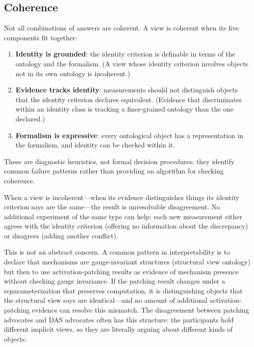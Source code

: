 \documentclass{article}
\begin{document}
\subsection{Coherence}\label{sec:coherence}

Not all combinations of answers are coherent.  A view is coherent when
its five components fit together:

\begin{enumerate}[leftmargin=*, label=(\roman*)]
\item \textbf{Identity is grounded}: the identity criterion is
      definable in terms of the ontology and the formalism.  (A view
      whose identity criterion involves objects not in its own ontology
      is incoherent.)
\item \textbf{Evidence tracks identity}: measurements should not
      distinguish objects that the identity criterion declares
      equivalent.  (Evidence that discriminates within an identity
      class is tracking a finer-grained ontology than the one
      declared.)
\item \textbf{Formalism is expressive}: every ontological object has
      a representation in the formalism, and identity can be checked
      within it.
\end{enumerate}

These are diagnostic heuristics, not formal decision procedures: they identify common failure patterns rather than providing an algorithm for checking coherence.

When a view is incoherent---when its evidence distinguishes things its
identity criterion says are the same---the result is unresolvable
disagreement.  No additional experiment of the same type can help:
each new measurement either agrees with the identity criterion (offering
no information about the discrepancy) or disagrees (adding another
conflict).

This is not an abstract concern.  A common pattern in interpretability
is to declare that mechanisms are gauge-invariant structures (structural
view ontology) but then to use activation-patching results as evidence
of mechanism presence without checking gauge invariance.  If the
patching result changes under a reparameterization that preserves
computation, it is distinguishing objects that the structural view says
are identical---and no amount of additional activation-patching evidence
can resolve this mismatch.  The disagreement between patching advocates
and DAS advocates often has this structure: the participants hold
different implicit views, so they are literally arguing about different
kinds of objects.
\end{document}
